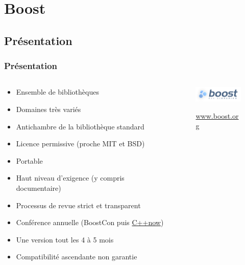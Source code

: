 \documentclass[C++.tex]{subfiles}
\begin{document}
\section{Boost}
\subsection*{Présentation}
\begin{frame}
	\frametitle{Présentation}
	\begin{columns}[T]
		\begin{column}{0.75\textwidth}
			\begin{itemize}
				\item Ensemble de bibliothèques
			
			
				\item Domaines très variés
				\item Antichambre de la bibliothèque standard
				

				\item Licence permissive (proche MIT et BSD)
				\item Portable
				\item Haut niveau d'exigence (y compris documentaire)
				\item Processus de revue strict et transparent
				\item Conférence annuelle (BoostCon puis \href{http://cppnow.org/}{C++now})
			
			
				\item Une version tout les 4 à 5 mois
				\item Compatibilité ascendante non garantie
			
			\end{itemize}
		\end{column}

		\begin{column}{0.25\textwidth}
			\begin{figure}[ht]
 				\begin{center}
					\includegraphics[height=0.07\textheight]{input_src/Boost.png}
				\end{center}
				\href{http://www.boost.org/}{{\small www.boost.org}}
			\end{figure}
		\end{column}
	\end{columns}	
\end{frame}
\end{document}
